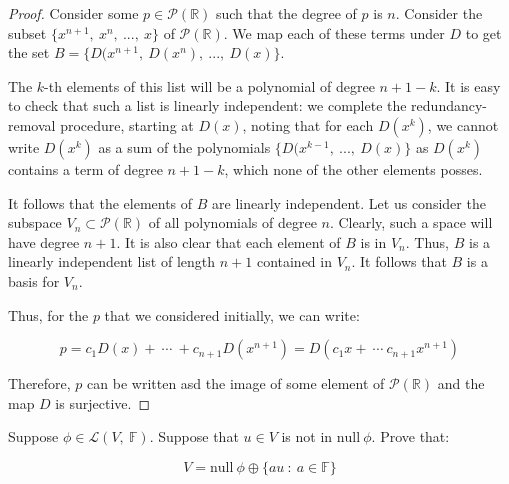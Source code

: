 \documentclass[10pt, oneside]{article}
\newenvironment{problem}[2][Problem]{\begin{trivlist}
\item[\hskip \labelsep {\bfseries #1}\hskip \labelsep {\bfseries #2.}]}{\end{trivlist}}
\newcommand{\R}{\mathbb{R}}
\newcommand{\pow}{\mathcal{P}}
\begin{document}
    \begin{proof}

      Consider some $p \in \pow(\R)$ such that the degree of $p$ is $n$. Consider the subset $\{x^{n + 1}, \ x^n, \ ..., \ x\}$ of $\pow(\R)$.
      We map each of these terms under $D$ to get the set $B = \{D(x^{n + 1}, \ D(x^n), \ ..., \ D(x)\}$.
      \newline

      The $k$-th elements of this list will be a polynomial of degree $n + 1 - k$. It is easy to check that such a list is linearly
      independent: we complete the redundancy-removal procedure, starting at $D(x)$, noting that for each $D(x^k)$, we cannot write
      $D(x^k)$ as a sum of the polynomials $\{D(x^{k - 1}, \ ..., \ D(x)\}$ as $D(x^k)$ contains a term of degree $n + 1 - k$, which
      none of the other elements posses.
      \newline

      It follows that the elements of $B$ are linearly independent. Let us consider the subspace $V_n \subset \pow(\R)$ of all polynomials
      of degree $n$. Clearly, such a space will have degree $n + 1$. It is also clear that each element of $B$ is in $V_n$. Thus, $B$ is a
      linearly independent list of length $n + 1$ contained in $V_n$. It follows that $B$ is a basis for $V_n$.
      \newline

      Thus, for the $p$ that we considered initially, we can write:

      $$p = c_1 D(x) + \ \cdots \ + c_{n + 1} D(x^{n + 1}) = D(c_1 x + \ \cdots \ c_{n + 1} x^{n + 1})$$

      Therefore, $p$ can be written asd the image of some element of $\pow(\R)$ and the map $D$ is surjective.

    \end{proof}

    \begin{problem}{3.29}
      Suppose $\phi \in \mathcal{L}(V, \ \mathbb{F})$. Suppose that $u \in V$ is not in $\text{null} \ \phi$. Prove that:

      $$V = \text{null} \ \phi \oplus \{au \ : \ a \in \mathbb{F}\}$$
    \end{problem}
\end{document}

